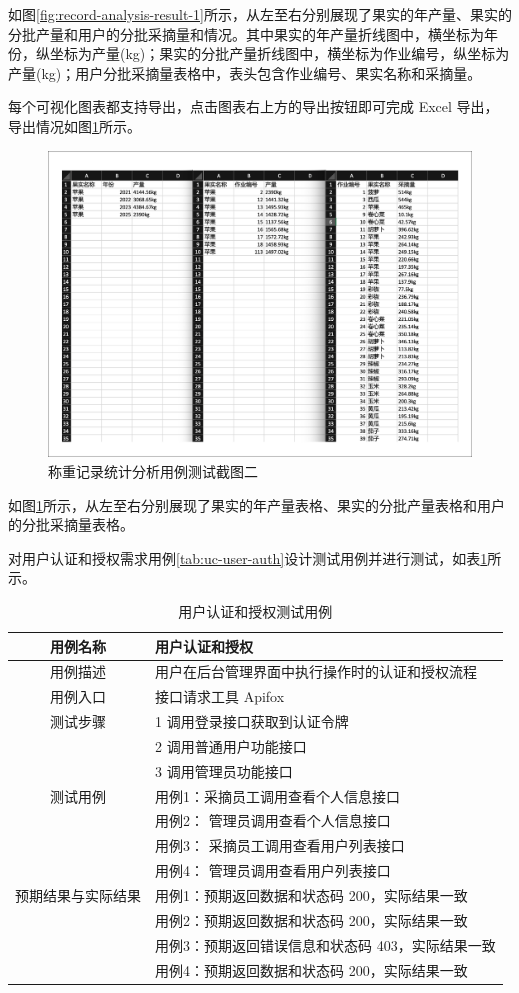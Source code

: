 如图\ref{fig:record-analysis-result-1}所示，从左至右分别展现了果实的年产量、果实的分批产量和用户的分批采摘量和情况。其中果实的年产量折线图中，横坐标为年份，纵坐标为产量(kg)；果实的分批产量折线图中，横坐标为作业编号，纵坐标为产量(kg)；用户分批采摘量表格中，表头包含作业编号、果实名称和采摘量。

每个可视化图表都支持导出，点击图表右上方的导出按钮即可完成 Excel 导出，导出情况如图\ref{fig:record-analysis-result-2}所示。

\begin{figure}[H]
    \centering
    \includegraphics[width=0.8\linewidth]{../result/record-analysis-result-2.png}
    \caption{称重记录统计分析用例测试截图二}
    \label{fig:record-analysis-result-2}
\end{figure}

如图\ref{fig:record-analysis-result-2}所示，从左至右分别展现了果实的年产量表格、果实的分批产量表格和用户的分批采摘量表格。

对用户认证和授权需求用例\ref{tab:uc-user-auth}设计测试用例并进行测试，如表\ref{tab:uc-user-auth-test}所示。

\begin{longtable}[ht]{|c|p{8cm}|}
\caption{用户认证和授权测试用例}
\label{tab:uc-user-auth-test}
\\
\hline
用例名称 & 用户认证和授权 \\
\hline
用例描述 & 用户在后台管理界面中执行操作时的认证和授权流程 \\
\hline
用例入口 & 接口请求工具 Apifox \\
\hline
测试步骤 & 1 调用登录接口获取到认证令牌 \\
& 2 调用普通用户功能接口 \\
& 3 调用管理员功能接口 \\
\hline
测试用例 & 用例1：采摘员工调用查看个人信息接口 \\
& 用例2： 管理员调用查看个人信息接口 \\
& 用例3： 采摘员工调用查看用户列表接口 \\
& 用例4： 管理员调用查看用户列表接口 \\
\hline
预期结果与实际结果 & 用例1：预期返回数据和状态码 200，实际结果一致 \\
& 用例2：预期返回数据和状态码 200，实际结果一致 \\
\hline
& 用例3：预期返回错误信息和状态码 403，实际结果一致 \\
& 用例4：预期返回数据和状态码 200，实际结果一致 \\
\hline
\end{longtable}

